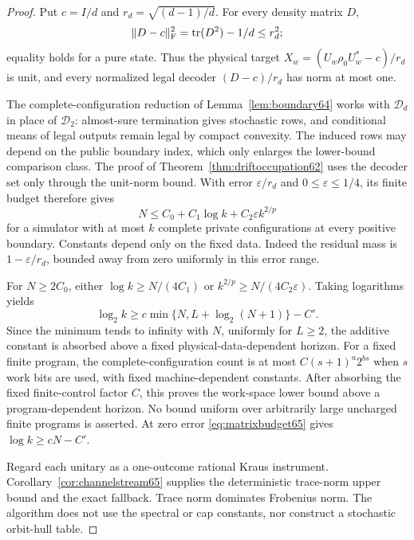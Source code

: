 \begin{proof}
Put $c=I/d$ and $r_d=\sqrt{(d-1)/d}$. For every density matrix $D$,
\[
 \|D-c\|_{\rm F}^2=\operatorname{tr}(D^2)-1/d\le r_d^2;
\]
equality holds for a pure state. Thus the physical target
$X_w=(U_w\rho_0U_w^*-c)/r_d$ is unit, and every normalized legal
decoder $(D-c)/r_d$ has norm at most one.

The complete-configuration reduction of
Lemma~\ref{lem:boundary64} works with $\mathcal D_d$ in place of
$\mathcal D_2$: almost-sure termination gives stochastic rows, and
conditional means of legal outputs remain legal by compact convexity.
The induced rows may depend on the public boundary index, which
only enlarges the lower-bound comparison class.
The proof of Theorem~\ref{thm:driftoccupation62} uses the decoder
set only through the unit-norm bound. With error
$\varepsilon/r_d$ and $0\le\varepsilon\le1/4$, its finite budget
therefore gives
\begin{equation}\label{eq:matrixbudget65}
 N\le C_0+C_1\log k+C_2\varepsilon k^{2/p}
\end{equation}
for a simulator with at most $k$ complete private configurations at
every positive boundary. Constants depend only on the fixed data.
Indeed the residual mass is $1-\varepsilon/r_d$, bounded away from
zero uniformly in this error range.

For $N\ge2C_0$, either
$\log k\ge N/(4C_1)$ or
$k^{2/p}\ge N/(4C_2\varepsilon)$.
Taking logarithms yields
\[
 \log_2k\ge c\min\{N,L+\log_2(N+1)\}-C'.
\]
Since the minimum tends to infinity with $N$, uniformly for $L\ge2$,
the additive constant is absorbed above a fixed physical-data-dependent horizon.
For a fixed finite program, the complete-configuration count is at
most $C(s+1)^a2^{bs}$ when $s$ work bits are used, with fixed
machine-dependent constants. After absorbing the fixed finite-control factor $C$, this proves the
work-space lower bound above a program-dependent horizon.
No bound uniform over arbitrarily large uncharged finite programs is
asserted.
At zero error \eqref{eq:matrixbudget65} gives $\log k\ge cN-C'$.

Regard each unitary as a one-outcome rational Kraus instrument.
Corollary~\ref{cor:channelstream65} supplies the deterministic
trace-norm upper bound and the exact fallback. Trace norm dominates
Frobenius norm. The algorithm does not use the spectral or cap
constants, nor construct a stochastic orbit-hull table.
\end{proof}

